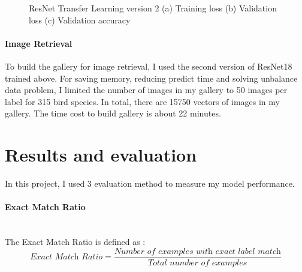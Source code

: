 \documentclass[runningheads]{llncs}
\begin{document}
\begin{figure}[H]
    \centering
    \caption{ResNet Transfer Learning version 2 (a) Training loss (b) Validation loss (c) Validation accuracy}
    \label{fig:resnet2}
\end{figure}
\paragraph{\bf Image Retrieval} 
To build the gallery for image retrieval, I used the second version of ResNet18 trained above. For saving memory, reducing predict time and solving unbalance data problem, I limited the number of images in my gallery to 50 images per label for 315 bird species. In total, there are 15750 vectors of images in my gallery. The time cost to build gallery is about 22 minutes.
\section{Results and evaluation}
In this project, I used 3 evaluation method to measure my model performance.
\paragraph{\large\bf Exact Match Ratio}\hspace*{\fill} \\
The Exact Match Ratio is defined as :
\begin{equation}
   \textit{Exact Match Ratio} = \frac{\textit{Number of examples with exact label match}}{\textit{Total number of examples}}
\end{equation}
\vspace{3cm}
\end{document}
